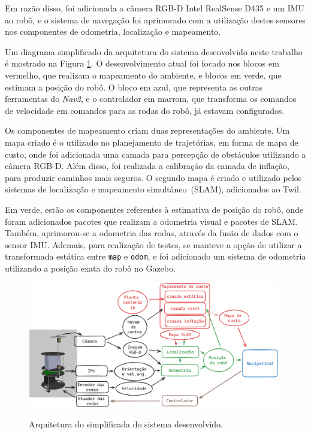 \documentclass[repeatfields,xlists,xpacks,oneside,yearsonly]{ufrgscca}
\begin{document}
Em razão disso, foi adicionada a câmera RGB-D Intel RealSense D435 e
um IMU ao robô, e o sistema de navegação foi aprimorado com a
utilização destes sensores nos componentes de odometria, localização
e mapeamento.

Um diagrama simplificado da arquitetura do sistema desenvolvido neste
trabalho é mostrado na Figura \ref{fig:arq_trabalho}. O
desenvolvimento atual foi focado nos blocos em vermelho, que realizam
o mapeamento do ambiente, e blocos em verde, que estimam a posição do
robô. O bloco em azul, que representa as outras ferramentas do
\textit{Nav2}, e o controlador em marrom, que transforma os comandos
de velocidade em comandos para as rodas do robô, já estavam
configurados.

Os componentes de mapeamento criam duas representações do ambiente.
Um mapa criado é o utilizado no planejamento de trajetórias, em forma
de mapa de custo, onde foi adicionada uma camada para percepção de
obstáculos utilizando a câmera RGB-D. Além disso, foi realizada a
calibração da camada de inflação, para produzir caminhos mais
seguros. O segundo mapa é criado e utilizado pelos sistemas de
localização e mapeamento simultâneo~(SLAM), adicionados ao Twil.

Em verde, estão os componentes referentes à estimativa de posição do
robô, onde foram adicionados pacotes que realizam a odometria visual
e pacotes de SLAM. Também, aprimorou-se a odometria das rodas,
através da fusão de dados com o sensor IMU. Ademais, para realização
de testes, se manteve a opção de utilizar a transformada estática
entre \texttt{map} e \texttt{odom}, e foi adicionado um sistema de
odometria utilizando a posição exata do robô no Gazebo.

\begin{figure}[H]
    {
        \centering
        \caption{Arquitetura do simplificada do sistema desenvolvido.}
        \label{fig:arq_trabalho}
        \includegraphics[width=0.98\textwidth]{arquitetura_simplificadav4.png}\\
    }
\end{figure}
\end{document}
